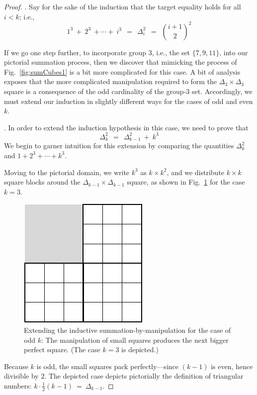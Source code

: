 \begin{proof}
\medskip

.
Say for the sake of the induction that the target equality holds for all $i < k$; i.e.,
\[ 1^3 \ + \ 2^3 \ + \cdots + \ i^3 \ \ = \ \ \Delta_i^2 \ \ = \ \ {{i+1} \choose 2}^2 \]

\medskip

If we go one step further, to incorporate group $3$, i.e., the set $\{7, 9, 11\}$, into our pictorial summation process, then we discover that mimicking the process of Fig.~\ref{fig:sumCubes1} is a bit more complicated for this case.  A bit of analysis exposes that the more complicated manipulation required to form the $\Delta_3 \times \Delta_3$ square is a consequence of the odd cardinality of the group-$3$ set.  Accordingly, we must extend our induction in slightly different ways for the cases of odd and even $k$.

\medskip

.
In order to extend the induction hypothesis in this case, we need to prove that
\[ \Delta_k^2 \ \ = \ \ \Delta_{k-1}^2 \ + \ k^3 \]
We begin to garner intuition for this extension by comparing the quantities $\Delta_k^2$ and $1 + 2^3 + \cdots + k^3$.

\smallskip

Moving to the pictorial domain, we write $k^3$ as $k \times k^2$, and we distribute $k \times k$ square blocks around the $\Delta_{k-1} \times \Delta_{k-1}$ square, as shown in Fig.~\ref{fig:sumCubes3} for the case $k=3$. 
\begin{figure}[ht]
\begin{center}
       \includegraphics[scale=0.35]{FiguresMaths/SumCubes3}
\caption{Extending the inductive summation-by-manipulation for the case of odd $k$:  The manipulation of small squares produces the next bigger perfect square.  (The case $k=3$ is depicted.)}
       \label{fig:sumCubes3}
\end{center}
\end{figure}
Because $k$ is odd, the small squares pack perfectly---since $(k-1)$ is even, hence divisible by $2$.   The depicted case depicts pictorially the definition of triangular numbers: $k \cdot \frac{1}{2}(k-1) \ = \ \Delta_{k-1}$.


\end{proof}
